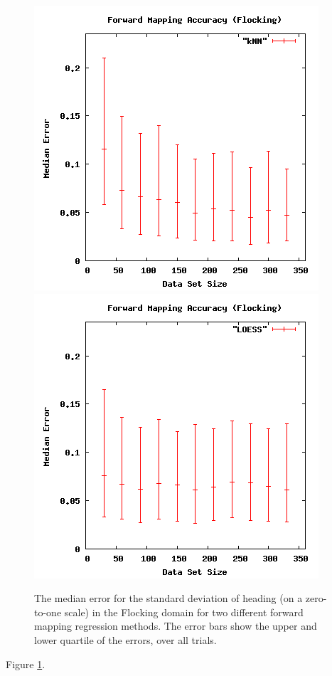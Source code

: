 \begin{figure}[ht]
\centering
\includegraphics[scale=.4]{images/results_flocking/fmacc-kNN.png}
\includegraphics[scale=.4]{images/results_flocking/fmacc-LOESS.png}
\caption{The median error for the standard deviation of heading (on a zero-to-one scale) in the Flocking domain for two different forward mapping regression methods.
The error bars show the upper and lower quartile of the errors, over all trials.}
\label{fig:flockfmacc}
\end{figure}

Figure \ref{fig:flockfmacc}.

